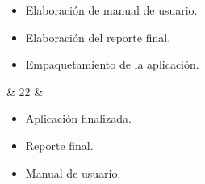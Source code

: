 \begin{longtabu}
	\begin{itemize}
		\item Elaboración de manual de usuario.
		\item Elaboraci\'on del reporte final.
		\item Empaquetamiento de la aplicación.
	\end{itemize} & 22 &
	\begin{itemize}
		\item Aplicación finalizada.
		\item Reporte final.
		\item Manual de usuario.	
	\end{itemize}
\end{longtabu}

%
%		
%
%
